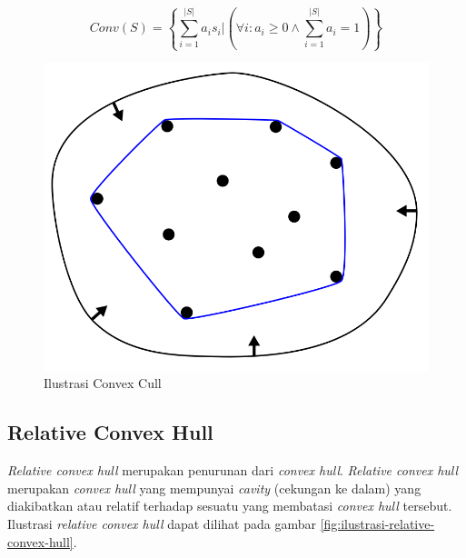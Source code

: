 \begin{equation}
    \label{eq:convex-hull}
    Conv(S)=\left\{ \sum_{i=1}^{|S|}{a_is_i} \big | (\forall{i}:a_i \ge 0 \wedge \sum_{i=1}^{|S|}{a_i=1} ) \right\}
\end{equation}
\begin{figure}[!h]
	\Centering
	\includegraphics [width=0.5\columnwidth]{bab2/img/ilustrasi-convex-hull}
	\caption {Ilustrasi Convex Cull}
	\label {fig:ilustrasi-convex-hull}
\end{figure}


\subsection{Relative Convex Hull}
\textit{Relative convex hull} merupakan penurunan dari \textit{convex hull}. \textit{Relative convex hull} merupakan \textit{convex hull} yang mempunyai \textit{cavity} (cekungan ke dalam) yang diakibatkan atau relatif terhadap sesuatu yang membatasi \textit{convex hull} tersebut. Ilustrasi \textit{relative convex hull} dapat dilihat pada gambar \ref{fig:ilustrasi-relative-convex-hull}.


